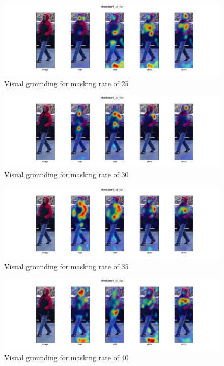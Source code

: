 \begin{figure}[htbp]
  \includegraphics[width=\linewidth]{img/mlm2/mlm-checkpoint_15_flat.png}
  \caption{Visual grounding for masking rate of 25} 
  \label{fig:mlm_3} 
\end{figure}

\begin{figure}[htbp]
  \includegraphics[width=\linewidth]{img/mlm2/mlm-checkpoint_30_flat.png}
  \caption{Visual grounding for masking rate of 30}
  \label{fig:mlm_4}
\end{figure}

\begin{figure}[htbp]
  \includegraphics[width=\linewidth]{img/mlm2/mlm-checkpoint_35_flat.png}
  \caption{Visual grounding for masking rate of 35}
  \label{fig:mlm_5}
\end{figure}

\begin{figure}[htbp]
  \includegraphics[width=\linewidth]{img/mlm2/mlm-checkpoint_40_flat.png}
  \caption{Visual grounding for masking rate of 40}
  \label{fig:mlm_6}
\end{figure}



